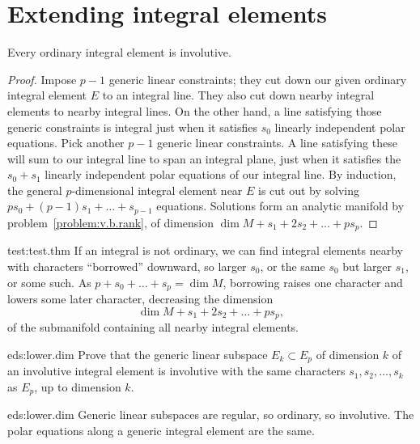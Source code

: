 \section{Extending integral elements}
\begin{lemma}\label{lemma:point.int.elements}
Every ordinary integral element is involutive.
\end{lemma}
\begin{proof}
Impose \(p-1\) generic linear constraints; they cut down our given ordinary integral element \(E\) to an integral line.
They also cut down nearby integral elements to nearby integral lines.
On the other hand, a line satisfying those generic constraints is integral just when it satisfies \(s_0\) linearly independent polar equations.
Pick another \(p-1\) generic linear constraints.
A line satisfying these will sum to our integral line to span an integral plane, just when it satisfies the \(s_0+s_1\) linearly independent polar equations of our integral line.
By induction, the general \(p\)-dimensional integral element near \(E\) is cut out by solving \(ps_0+(p-1)s_1+\dots+s_{p-1}\) equations.
Solutions form an analytic manifold by problem~\vref{problem:v.b.rank}, of dimension \(\dim M+s_1+2s_2+\dots+ps_p\).
\end{proof}
\begin{answer}{test:test.thm}
If an integral is not ordinary, we can find integral elements nearby with characters ``borrowed'' downward, so larger \(s_0\), or the same \(s_0\) but larger \(s_1\), or some such.
As \(p+s_0+\dots+s_p=\dim M\), borrowing raises one character and lowers some later character, decreasing the dimension 
\[
\dim M + s_1 + 2s_2 + \dots + ps_p,
\]
of the submanifold containing all nearby integral elements.
\end{answer}
\begin{problem}{eds:lower.dim}
Prove that the generic linear subspace \(E_k \subset E_p\) of dimension \(k\) of an involutive integral element is involutive with the same characters \(s_1,s_2,\dots,s_k\) as \(E_p\), up to dimension \(k\).
\end{problem}
\begin{answer}{eds:lower.dim}
Generic linear subspaces are regular, so ordinary, so involutive.
The polar equations along a generic integral element are the same.
\end{answer}

